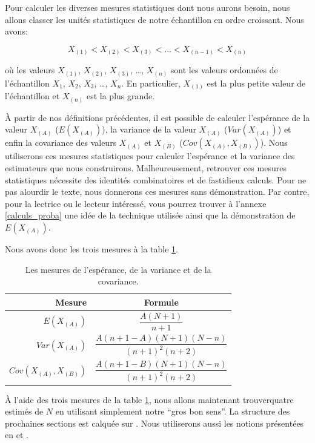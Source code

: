 \documentclass[10pt]{article}
\begin{document}
Pour calculer les diverses mesures statistiques dont nous aurons besoin,
nous allons classer les unités statistiques de notre échantillon en
ordre croissant. Nous avons:

\[X_{(1)} <  X_{(2)} < X_{(3)} < \ldots < X_{(n-1)} < X_{(n)}\]

où les valeurs \(X_{(1)}\), \(X_{(2)}\), \(X_{(3)}\), \ldots{},
\(X_{(n)}\) sont les valeurs ordonnées de l'échantillon \(X_1\),
\(X_2\), \(X_3\), \ldots{}, \(X_n\). En particulier, \(X_{(1)}\) est la
plus petite valeur de l'échantillon et \(X_{(n)}\) est la plus grande.

À partir de nos définitions précédentes, il est possible de calculer
l'espérance de la valeur \(X_{(A)}\) (\(E(X_{(A)})\)), la variance de la
valeur \(X_{(A)}\) (\(Var(X_{(A)})\)) et enfin la covariance des valeurs
\(X_{(A)}\) et \(X_{(B)}\) (\(Cov(X_{(A)},X_{(B)})\)). Nous utiliserons
ces mesures statistiques pour calculer l'espérance et la variance des
estimateurs que nous construirons. Malheureusement, retrouver ces
mesures statistiques nécessite des identités combinatoires et de
fastidieux calculs. Pour ne pas alourdir le texte, nous donnerons ces
mesures sans démonstration. Par contre, pour la lectrice ou le lecteur
intéressé, vous pourrez trouver à l'annexe \ref{calculs_proba} une idée
de la technique utilisée ainsi que la démonstration de \(E(X_{(A)})\).

Nous avons donc les trois mesures à la table \ref{tab:mesures_stat}.

\begin{table}[ht]
\begin{center}
\begin{tabular}{|r|c|}
\hline
Mesure & Formule \\
\hline
\hline
$E(X_{(A)})$ & $\dfrac{A(N+1)}{n+1}$ \\ \hline
$Var(X_{(A)})$ & $\dfrac{A(n+1-A)(N+1)(N-n)}{(n+1)^2(n+2)}$ \\ \hline
$Cov(X_{(A)},X_{(B)})$ & $\dfrac{A(n+1-B)(N+1)(N-n)}{(n+1)^2(n+2)}$ \\ \hline
\end{tabular}
\end{center}
\caption{\label{tab:mesures_stat} {Les mesures de l'espérance, de la variance et de la covariance.} }
\end{table}

À l'aide des trois mesures de la table \ref{tab:mesures_stat}, nous
allons maintenant trouverquatre estimés de \(N\) en utilisant simplement
notre ``gros bon sens''. La structure des prochaines sections est
calquée sur \cite{Johnson}. Nous utiliserons aussi les notions
présentées en \cite{Goodman1952} et \cite{Goodman1954}.
\end{document}
